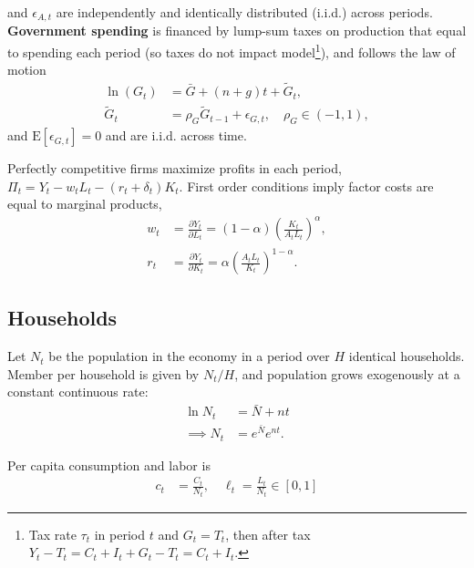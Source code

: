 \documentclass{article}
\newcommand{\E}[1]{\mathrm{E}\left[#1\right]}
\begin{document}
        and $\epsilon_{A, t}$ are independently and identically distributed (i.i.d.) across periods. \textbf{Government spending} is financed by lump-sum taxes on production that equal to spending each period (so taxes do not impact model\footnote{Tax rate $\tau_t$ in period $t$ and $G_t = T_t$, then after tax $Y_t - T_t = C_t + I_t + G_t - T_t = C_t + I_t$.}), and follows the law of motion
        \begin{align}
            \ln(G_t) &= \bar{G} + (n + g)t + \tilde{G}_t,
            \\
            \tilde{G}_t &= \rho_G \tilde{G}_{t - 1} + \epsilon_{G, t},
            \quad \rho_G \in (-1, 1),
        \end{align}
        and $\E{\epsilon_{G, t}} = 0$ and are i.i.d. across time.
        
        Perfectly competitive firms maximize profits in each period, $\Pi_t = Y_{t} - w_t L_t - (r_t + \delta_t) K_t$. First order conditions imply factor costs are equal to marginal products,
        \begin{align}
            w_t &= \frac{\partial Y_t}{\partial L_t} = (1-\alpha) \left(\frac{K_t}{A_t L_t}\right)^\alpha,
            \label{eqn:wage}
            \\
            r_t &= \frac{\partial Y_t}{\partial K_t} = \alpha \left(\frac{A_t L_t}{K_t}\right)^{1-\alpha}.
            \label{eqn:interest}
        \end{align}
        
    \subsection{Households}
        
        Let $N_t$ be the population in the economy in a period over $H$ identical households. Member per household is given by $N_t / H$, and population grows exogenously at a constant continuous rate:
        \begin{align}
            \ln N_t &= \bar{N} + nt \\
            \implies
            N_t &= e^{\bar{N}}e^{nt}. \label{eqn:population}
        \end{align}
        
        Per capita consumption and labor is
        \begin{align}
            c_t &= \frac{C_t}{N_t}, \quad
            \ell_t = \frac{L_t}{N_t} \in [0, 1]
        \end{align}
        
\end{document}
